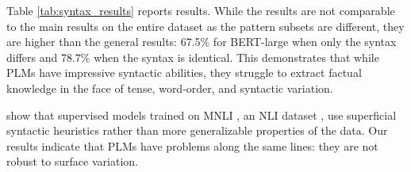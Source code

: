 


Table \ref{tab:syntax_results}
reports results.
While the results are not comparable to the main results on
the entire dataset as the pattern subsets are different,
they are higher than the general results: 67.5\% for BERT-large when only 
the syntax differs and 78.7\% when the syntax is
identical. This demonstrates that while PLMs have impressive syntactic abilities, 
they struggle to extract factual knowledge in the face of
tense, word-order, and syntactic variation.


\citet{mccoy2019right}  show that supervised models trained on MNLI \cite{mnli}, an NLI
dataset \cite{snli}, use
superficial syntactic heuristics rather than more
generalizable properties of the data.
Our results indicate that PLMs have  problems along
the same lines:
they are not robust to surface variation.


